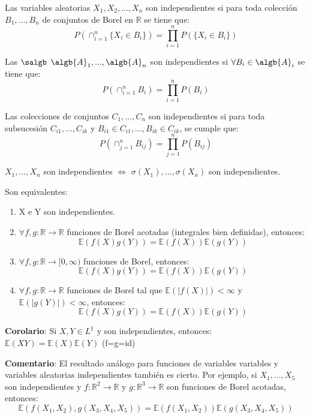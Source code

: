\documentclass{apuntes}
\begin{document}
\begin{defn}
Las variables aleatorias $X_1, X_2,...,X_n$ son independientes si para toda colección $B_1,...,B_n$ de conjuntos de Borel en $\mathbb{R}$ se tiene que:
\[
P(\cap_{i=1}^n \{X_i \in B_i\})= \prod_{i=1}^{n} P(\{X_i \in B_i\})
\]
\end{defn}

\begin{defn}
Las $\salgb$ $\algb{A}_1,...,\algb{A}_n$ son independientes si $\forall B_i \in \algb{A}_i$ se tiene que:
\[
P(\cap_{i=1}^n B_i) = \prod_{i=1}^{n} P(B_i)
\]
\end{defn}

\begin{defn}
Las colecciones de conjuntos $C_1,...,C_n$ son independientes si para toda subsucesión $C_{i1},...,C_{ik}$ y $B_{i1} \in C_{i1},..., B_{ik} \in C_{ik}$, se cumple que:
\[
P(\cap_{j=1}^n B_{ij})=\prod_{j=1}^{n}P(B_{ij})
\]
\end{defn}

\obs $X_1,...,X_n$ son independientes $\Leftrightarrow$ $\sigma(X_1),...,\sigma(X_n)$ son independientes.

\begin{theorem}
Son equivalentes:
\begin{enumerate}
\item X e Y son independientes.
\item $\forall f,g: \mathbb{R} \rightarrow \mathbb{R}$ funciones de Borel acotadas (integrales bien definidas), entonces:
\[
\mathbb{E}(f(X)g(Y))=\mathbb{E}(f(X))\mathbb{E}(g(Y))
\]
\item $\forall f,g: \mathbb{R} \rightarrow [0, \infty)$ funciones de Borel, entonces:
\[
\mathbb{E}(f(X)g(Y))=\mathbb{E}(f(X))\mathbb{E}(g(Y))
\]
\item  $\forall f,g: \mathbb{R} \rightarrow \mathbb{R}$ funciones de Borel tal que $\mathbb{E}(|f(X)|)<\infty$ y $\mathbb{E}(|g(Y)|)<\infty$, entonces:
\[
\mathbb{E}(f(X)g(Y))=\mathbb{E}(f(X))\mathbb{E}(g(Y))
\]
\end{enumerate}
\end{theorem}

\textbf{Corolario}: Si $X,Y \in L^1$ y son independientes, entonces: $\mathbb{E}(XY)=\mathbb{E}(X)\mathbb{E}(Y)$ (f=g=id)

\textbf{Comentario}: El resultado análogo para funciones de variables variables y variables aleatorias independientes también es cierto. Por ejemplo, si $X_1,...,X_5$ son independientes y $f:\mathbb{R}^2 \rightarrow \mathbb{R}$ y $g:\mathbb{R}^3 \rightarrow \mathbb{R}$ son funciones de Borel acotadas, entonces:
\[
\mathbb{E}(f(X_1,X_2),g(X_3,X_4,X_5))= \mathbb{E}(f(X_1,X_2)) \mathbb{E}(g(X_3,X_4,X_5))
\]
\end{document}
